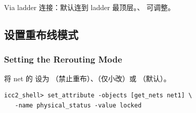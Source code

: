 Via ladder 连接：默认连到 ladder 最顶层。、 可调整。

\subsection{设置重布线模式}
\subsubsection*{Setting the Rerouting Mode}

将 net 的  设为 （禁止重布）、（仅小改）或 （默认）。

\begin{lstlisting}
icc2_shell> set_attribute -objects [get_nets net1] \
   -name physical_status -value locked
\end{lstlisting}
